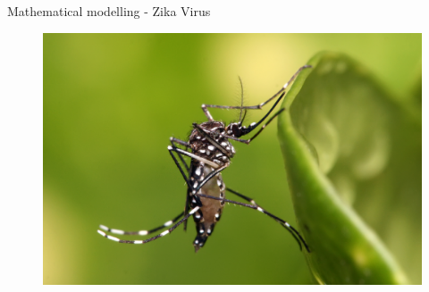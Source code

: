\documentclass[table]{beamer}\usepackage[]{graphicx}\usepackage[]{color}
\begin{document}
\begin{frame}[fragile]{Mathematical modelling - Zika Virus}
\begin{minipage}{.6\textwidth}
\end{minipage} \hfill
\begin{minipage} {.37\textwidth}
\begin{figure}
  \centering
  \includegraphics[width=\textwidth,keepaspectratio]{Aedes_aegypti.jpg}
\end{figure}
\end{minipage}


\end{frame}
\end{document}
